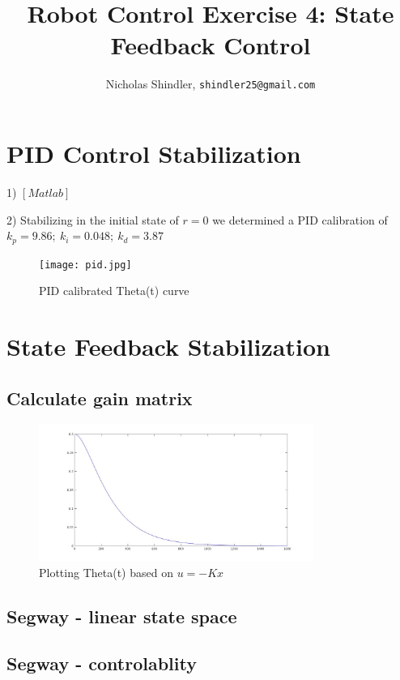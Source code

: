 \documentclass{article}
\title{Robot Control Exercise 4: State Feedback Control}
\author{Nicholas Shindler, \texttt{shindler25@gmail.com}}
\begin{document}
\maketitle

\section{PID Control Stabilization}

1) $[Matlab]$

2) Stabilizing in the initial state of $r=0$ we determined a PID calibration of $k_p=9.86;\ k_i=0.048;\ k_d=3.87$

\begin{figure}[H]
    \centering
    \texttt{[image: pid.jpg]}
    \caption{PID calibrated Theta(t) curve}
    \label{fig:pid}
\end{figure}

\section{State Feedback Stabilization}
\subsection{Calculate gain matrix}


\begin{figure}[H]
    \centering
    \includegraphics[width=0.8\textwidth]{inv_pen_Ku.jpg}
    \caption{Plotting Theta(t) based on $u=-Kx$}
    \label{fig:eig_inv_pendulum}
\end{figure}


\subsection{Segway - linear state space}



\subsection{Segway - controlablity}
\end{document}
